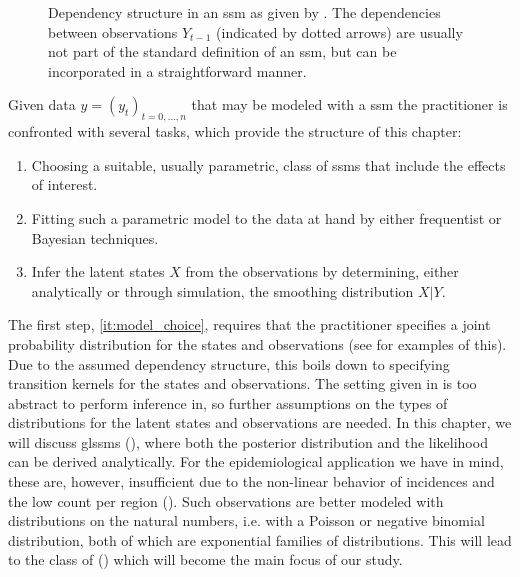 \begin{figure}
    \centering
    \caption{Dependency structure in an \gls{ssm} as given by . The dependencies between observations $Y_{t-1}$ (indicated by dotted arrows) are usually not part of the standard definition of an \gls{ssm}, but can be incorporated in a straightforward manner.}
    \label{fig:ssm_dependencies}
\end{figure}


Given data $y = (y_t)_{t = 0, \dots, n}$ that may be modeled with a \gls{ssm} the practitioner is confronted with several tasks, which provide the structure of this chapter:

\begin{enumerate}
    \item\label{it:model_choice} Choosing a suitable, usually parametric, class of \glspl{ssm} that include the effects of interest.
    \item\label{it:model_fitting} Fitting such a parametric model to the data at hand by either frequentist or Bayesian techniques.
    \item\label{it:smoothing_problem} Infer the latent states $X$ from the observations by determining, either analytically or through simulation, the smoothing distribution $X|Y$.
\end{enumerate}

The first step, \cref{it:model_choice}, requires that the practitioner specifies a joint probability distribution for the states and observations (see  for examples of this).
Due to the assumed dependency structure, this boils down to specifying transition kernels for the states and observations.
The setting given in  is too abstract to perform inference in, so further assumptions on the types of distributions for the latent states and observations are needed.
In this chapter, we will discuss \glspl{glssm}  (), where both the posterior distribution and the likelihood can be derived analytically. For the epidemiological application we have in mind, these are, however, insufficient due to the non-linear behavior of incidences and the low count per region ().
Such observations are better modeled with distributions on the natural numbers, i.e. with a Poisson or negative binomial distribution, both of which are exponential families of distributions. This will lead to the class of  () which will become the main focus of our study.

